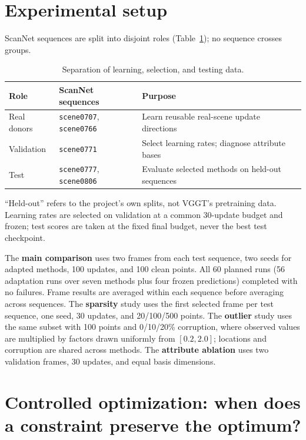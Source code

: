 \documentclass{article}
\begin{document}
\section{Experimental setup}

ScanNet sequences are split into disjoint roles (Table~\ref{tab:split}); no sequence crosses groups.

\begin{table}[h]
  \caption{Separation of learning, selection, and testing data.}
  \label{tab:split}
  \centering
  \small
  \begin{tabular}{lll}
    \toprule
    Role & ScanNet sequences & Purpose \\
    \midrule
    Real donors & \texttt{scene0707}, \texttt{scene0766} & Learn reusable real-scene update directions \\
    Validation & \texttt{scene0771} & Select learning rates; diagnose attribute bases \\
    Test & \texttt{scene0777}, \texttt{scene0806} & Evaluate selected methods on held-out sequences \\
    \bottomrule
  \end{tabular}
\end{table}
 ``Held-out'' refers to the project's own splits, not VGGT's pretraining data. Learning rates are selected on validation at a common 30-update budget and frozen; test scores are taken at the fixed final budget, never the best test checkpoint.

The \textbf{main comparison} uses two frames from each test sequence, two seeds for adapted methods, 100 updates, and 100 clean points. All 60 planned runs (56 adaptation runs over seven methods plus four frozen predictions) completed with no failures. Frame results are averaged within each sequence before averaging across sequences. The \textbf{sparsity} study uses the first selected frame per test sequence, one seed, 30 updates, and 20/100/500 points. The \textbf{outlier} study uses the same subset with 100 points and 0/10/20\% corruption, where observed values are multiplied by factors drawn uniformly from $[0.2, 2.0]$; locations and corruption are shared across methods. The \textbf{attribute ablation} uses two validation frames, 30 updates, and equal basis dimensions.

\section{Controlled optimization: when does a constraint preserve the optimum?}
\end{document}
